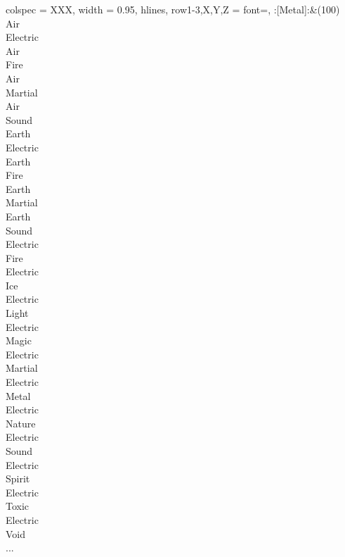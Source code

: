 \begin{longtblr}[
	caption = {2v1 Defending Weak},
	label = {2v1-Defending-Weak},
]{
	colspec = {XXX}, width = 0.95\linewidth,
	hlines,
	row{1-3,X,Y,Z} = {font=\bfseries},
}
	:[Metal]:&{(100)\\
	Air \\
	Electric \\
	Air \\
	Fire \\
	Air \\
	Martial \\
	Air \\
	Sound \\
	Earth \\
	Electric \\
	Earth \\
	Fire \\
	Earth \\
	Martial \\
	Earth \\
	Sound \\
	Electric \\
	Fire \\
	Electric \\
	Ice \\
	Electric \\
	Light \\
	Electric \\
	Magic \\
	Electric \\
	Martial \\
	Electric \\
	Metal \\
	Electric \\
	Nature \\
	Electric \\
	Sound \\
	Electric \\
	Spirit \\
	Electric \\
	Toxic \\
	Electric \\
	Void \\
	...\\
	}\\


\end{longtblr}
